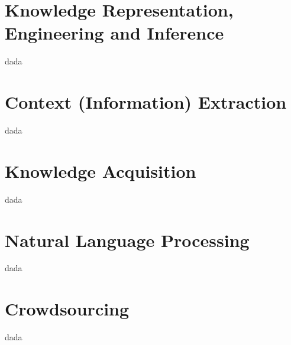 \section{Knowledge Representation, Engineering and Inference}
\label{section:bg:knowledge}
dada

\section{Context (Information) Extraction}
\label{section:bg:context}
dada

\section{Knowledge Acquisition}
\label{section:bg:ka}
dada

\section{Natural Language Processing}
\label{section:bg:nlp}
dada

\section{Crowdsourcing}
\label{section:bg:crowdsourcing}
dada
